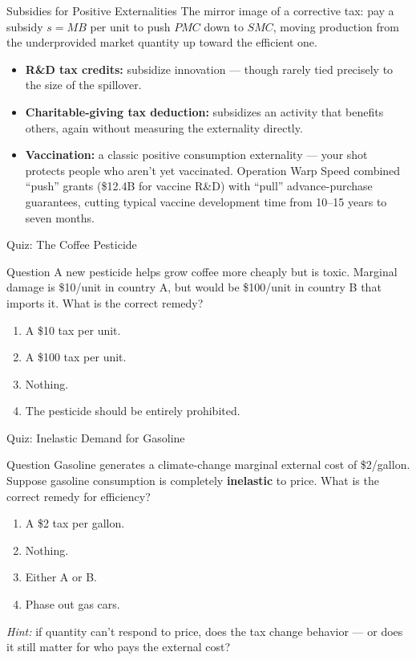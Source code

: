 \documentclass[11pt,aspectratio=169]{beamer}
\begin{document}
\begin{frame}{Subsidies for Positive Externalities}
  The mirror image of a corrective tax: pay a subsidy \(s = MB\) per unit to push \(PMC\) down to \(SMC\), moving production from the underprovided market quantity up toward the efficient one.
  \begin{itemize}
    \item \textbf{R\&D tax credits:} subsidize innovation --- though rarely tied precisely to the size of the spillover.
    \item \textbf{Charitable-giving tax deduction:} subsidizes an activity that benefits others, again without measuring the externality directly.
    \item \textbf{Vaccination:} a classic positive consumption externality --- your shot protects people who aren't yet vaccinated. Operation Warp Speed combined ``push'' grants (\$12.4B for vaccine R\&D) with ``pull'' advance-purchase guarantees, cutting typical vaccine development time from 10--15 years to seven months.
  \end{itemize}
\end{frame}

\begin{frame}{Quiz: The Coffee Pesticide}
  \begin{block}{Question}
    A new pesticide helps grow coffee more cheaply but is toxic. Marginal damage is \$10/unit in country A, but would be \$100/unit in country B that imports it. What is the correct remedy?
  \end{block}
  \begin{enumerate}
    \item[A.] A \$10 tax per unit.
    \item[B.] A \$100 tax per unit.
    \item[C.] Nothing.
    \item[D.] The pesticide should be entirely prohibited.
  \end{enumerate}


\end{frame}

\begin{frame}{Quiz: Inelastic Demand for Gasoline}
  \begin{block}{Question}
    Gasoline generates a climate-change marginal external cost of \$2/gallon. Suppose gasoline consumption is completely \textbf{inelastic} to price. What is the correct remedy for efficiency?
  \end{block}
  \begin{enumerate}
    \item[A.] A \$2 tax per gallon.
    \item[B.] Nothing.
    \item[C.] Either A or B.
    \item[D.] Phase out gas cars.
  \end{enumerate}
  \vspace{0.4em}
  \small \emph{Hint:} if quantity can't respond to price, does the tax change behavior --- or does it still matter for who pays the external cost?
\end{frame}
\end{document}
